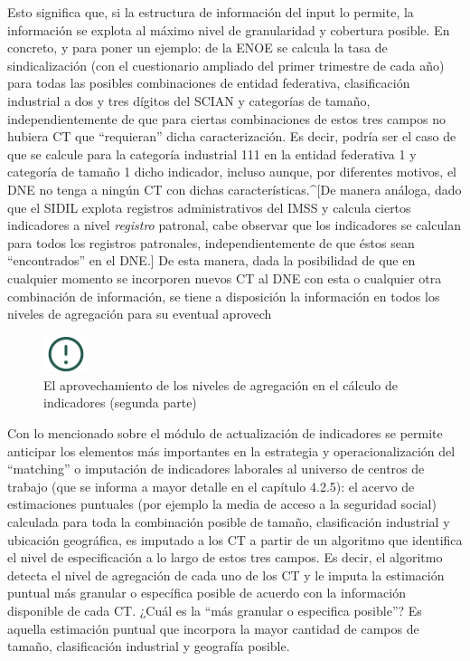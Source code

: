 \documentclass[
]{article}
\begin{document}
Esto significa que, si la estructura de información del input lo permite, la información se explota al máximo nivel de granularidad y cobertura posible. En concreto, y para poner un ejemplo: de la ENOE se calcula la tasa de sindicalización (con el cuestionario ampliado del primer trimestre de cada año) para todas las posibles combinaciones de entidad federativa, clasificación industrial a dos y tres dígitos del SCIAN y categorías de tamaño, independientemente de que para ciertas combinaciones de estos tres campos no hubiera CT que ``requieran'' dicha caracterización. Es decir, podría ser el caso de que se calcule para la categoría industrial 111 en la entidad federativa 1 y categoría de tamaño 1 dicho indicador, incluso aunque, por diferentes motivos, el DNE no tenga a ningún CT con dichas características.\^{}{[}De manera análoga, dado que el SIDIL explota registros administrativos del IMSS y calcula ciertos indicadores a nivel \emph{registro} patronal, cabe observar que los indicadores se calculan para todos los registros patronales, independientemente de que éstos sean ``encontrados'' en el DNE.{]} De esta manera, dada la posibilidad de que en cualquier momento se incorporen nuevos CT al DNE con esta o cualquier otra combinación de información, se tiene a disposición la información en todos los niveles de agregación para su eventual aprovech

\begin{figure}
\includegraphics[width=50px,style="float:left; background-color: #fff; padding-right:1em"]{images-1/important-icon} \caption{El aprovechamiento de los niveles de agregación en el cálculo de indicadores (segunda parte)}\label{fig:aprovechamientonivelesagregacion}
\end{figure}

\begin{rmdcomment}
Con lo mencionado sobre el módulo de actualización de indicadores se
permite anticipar los elementos más importantes en la estrategia y
operacionalización del ``matching'' o imputación de indicadores
laborales al universo de centros de trabajo (que se informa a mayor
detalle en el capítulo 4.2.5): el acervo de estimaciones puntuales (por
ejemplo la media de acceso a la seguridad social) calculada para toda la
combinación posible de tamaño, clasificación industrial y ubicación
geográfica, es imputado a los CT a partir de un algoritmo que identifica
el nivel de especificación a lo largo de estos tres campos. Es decir, el
algoritmo detecta el nivel de agregación de cada uno de los CT y le
imputa la estimación puntual más granular o específica posible de
acuerdo con la información disponible de cada CT. ¿Cuál es la ``más
granular o especifica posible''? Es aquella estimación puntual que
incorpora la mayor cantidad de campos de tamaño, clasificación
industrial y geografía posible.
\end{rmdcomment}
\end{document}
